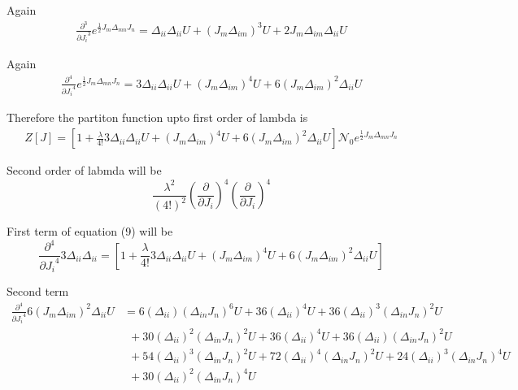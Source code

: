 \documentclass[12pt, letterpaper]{article}
\newcommand*{\1}{\hspace{1pt}}
\begin{document}
    Again    
    \begin{equation}
    \begin{split}
        \frac{\partial^3}{{\partial J_{i}}^3} e^{\frac{1}{2}J_{m}\Delta_{mn}J_{n}} = \Delta_{ii}\Delta_{ii}U + (J_{m}\Delta_{im})^{3} U + 2J_{m}\Delta_{im}\Delta_{ii} U 
    \end{split}
    \end{equation}

Again    
    \begin{equation}
    \begin{split}
        \frac{\partial^4}{{\partial J_{i}}^4} e^{\frac{1}{2}J_{m}\Delta_{mn}J_{n}} = 3\Delta_{ii}\Delta_{ii}U + (J_{m}\Delta_{im})^{4} U + 6(J_{m}\Delta_{im})^{2}\Delta_{ii} U 
    \end{split}
    \end{equation}

    Therefore the partiton function upto first order of lambda is
    \begin{align}
        Z[J] = [1+\frac{\lambda}{4!}3\Delta_{ii}\Delta_{ii}U + (J_{m}\Delta_{im})^{4} U + 6(J_{m}\Delta_{im})^{2}\Delta_{ii} U]\mathcal{N{_0}}e^{\frac{1}{2}J_{m}\Delta_{mn}J_{n}}
    \end{align}
    
    Second order of labmda will be
    \begin{equation*}
        \frac{\lambda ^2}{(4!)^2}(\frac{\partial }{\partial J_{i}})^{4}(\frac{\partial }{\partial J_{i}})^{4}
    \end{equation*}

    First term of equation (9) will be
    \begin{equation}
        \frac{\partial ^4}{{\partial J_{i}}^4} 3\Delta_{ii}\Delta_{ii} = [1+\frac{\lambda}{4!}3\Delta_{ii}\Delta_{ii}U + (J_{m}\Delta_{im})^{4} U + 6(J_{m}\Delta_{im})^{2}\Delta_{ii} U]
    \end{equation}

    Second term 
    \begin{align*}
        \frac{\partial ^4}{{\partial J_{i}}^4}6(J_{m}\Delta_{im})^{2}\Delta_{ii} U &  = 6(\Delta_{ii})(\Delta_{in}J_{n})^{6}U + 36(\Delta_{ii})^{4}U + 36(\Delta_{ii})^{3}(\Delta_{in}J_{n})^{2}U \\
        &  \ \ + 30(\Delta_{ii})^{2}(\Delta_{in}J_{n})^{2}U + 36(\Delta_{ii})^{4}U + 36(\Delta_{ii})(\Delta_{in}J_{n})^{2}U  \\ 
        & \ \ + 54(\Delta_{ii})^{3}(\Delta_{in}J_{n})^{2}U + 72(\Delta_{ii})^{4}(\Delta_{in}J_{n})^{2}U + 24(\Delta_{ii})^{3}(\Delta_{in}J_{n})^{4}U  \\ 
        & \ \ + 30(\Delta_{ii})^{2}(\Delta_{in}J_{n})^{4}U
    \end{align*}
\end{document}
